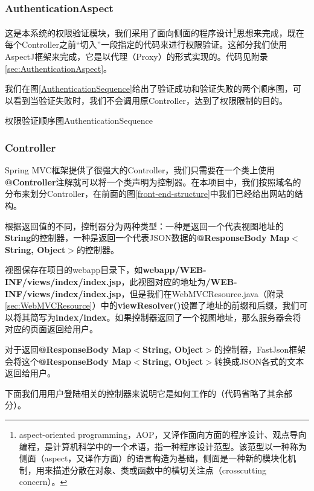 \subsubsection{AuthenticationAspect}
这是本系统的权限验证模块，我们采用了面向侧面的程序设计\footnote{aspect-oriented programming，AOP，又译作面向方面的程序设计、观点导向编程，是计算机科学中的一个术语，指一种程序设计范型。该范型以一种称为侧面（aspect，又译作方面）的语言构造为基础，侧面是一种新的模块化机制，用来描述分散在对象、类或函数中的横切关注点（crosscutting concern）。}思想来完成，既在每个Controller之前``切入''一段指定的代码来进行权限验证。这部分我们使用AspectJ框架来完成，它是以代理（Proxy）的形式实现的。代码见附录\ref{sec:AuthenticationAspect}。

我们在图\ref{AuthenticationSequence}给出了验证成功和验证失败的两个顺序图，可以看到当验证失败时，我们不会调用原Controller，达到了权限限制的目的。

\begin{pics}[htbp]{权限验证顺序图}{AuthenticationSequence}
\end{pics}

\subsubsection{Controller}
Spring MVC框架提供了很强大的Controller，我们只需要在一个类上使用\textbf{@Controller}注解就可以将一个类声明为控制器。在本项目中，我们按照域名的分布来划分Controller，在前面的图\ref{front-end-structure}中我们已经给出网站的结构。

根据返回值的不同，控制器分为两种类型：一种是返回一个代表视图地址的\textbf{String}的控制器，一种是返回一个代表JSON数据的\textbf{@ResponseBody Map$<$String, Object$>$}的控制器。

视图保存在项目的webapp目录下，如\textbf{webapp/WEB-INF/views/index/index.jsp}，此视图对应的地址为\textbf{/WEB-INF/views/index/index.jsp}，但是我们在WebMVCResource.java（附录\ref{sec:WebMVCResource}）中的\textbf{viewResolver()}设置了地址的前缀和后缀，我们可以将其简写为\textbf{index/index}。如果控制器返回了一个视图地址，那么服务器会将对应的页面返回给用户。

对于返回\textbf{@ResponseBody Map$<$String, Object$>$}的控制器，FastJson框架会将这个\textbf{@ResponseBody Map$<$String, Object$>$}转换成JSON各式的文本返回给用户。

下面我们用用户登陆相关的控制器来说明它是如何工作的（代码省略了其余部分）。

